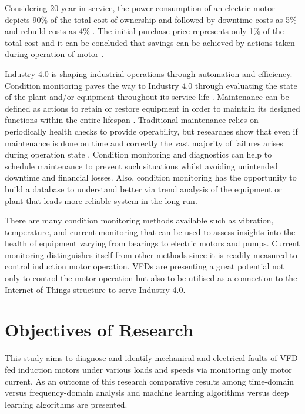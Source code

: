 Considering 20-year in service, the power consumption of an electric motor depicts 90\% of the total cost of ownership and followed by downtime costs as 5\% and rebuild costs as 4\% \cite{waide2011energy}. The initial purchase price represents only 1\% of the total cost and it can be concluded that savings can be achieved by actions taken during operation of motor \cite{waide2011energy}.

Industry 4.0 is shaping industrial operations through automation and efficiency. Condition monitoring paves the way to Industry 4.0 through evaluating the state of the plant and/or equipment throughout its service life \cite{en201713306}. Maintenance can be defined as actions to retain or restore equipment in order to maintain its designed functions within the entire lifespan \cite{en201713306}. Traditional maintenance relies on periodically health checks to provide operability, but researches show that even if maintenance is done on time and correctly the vast majority of failures arises during operation state \cite{motor1985report}. Condition monitoring and diagnostics can help to schedule maintenance to prevent such situations whilst avoiding unintended downtime and financial losses. Also, condition monitoring has the opportunity to build a database to understand better via trend analysis of the equipment or plant that leads more reliable system in the long run. 

There are many condition monitoring methods available such as vibration, temperature, and current monitoring that can be used to assess insights into the health of equipment varying from bearings to electric motors and pumps. Current monitoring distinguishes itself from other methods since it is readily measured to control induction motor operation. VFDs are presenting a great potential not only to control the motor operation but also to be utilised as a connection to the Internet of Things structure to serve Industry 4.0.
\pagebreak
\section{Objectives of Research}
\label{objectives}

This study aims to diagnose and identify mechanical and electrical faults of VFD-fed induction motors under various loads and speeds via monitoring only motor current. As an outcome of this research comparative results among time-domain versus frequency-domain analysis and machine learning algorithms versus deep learning algorithms are presented.

